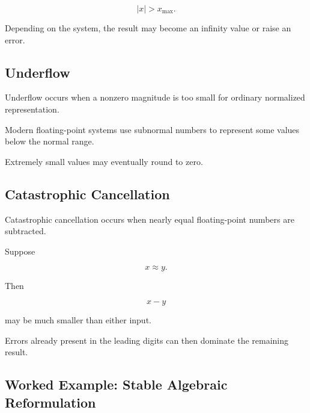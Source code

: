 \[
\boxed{
|x|
>
x_{\max}.
}
\]

Depending on the system, the result may become an infinity value or raise
an error.

\subsection{Underflow}
\label{subsec:numerical-underflow}

Underflow occurs when a nonzero magnitude is too small for ordinary
normalized representation.

Modern floating-point systems use subnormal numbers to represent some
values below the normal range.

Extremely small values may eventually round to zero.

\subsection{Catastrophic Cancellation}
\label{subsec:catastrophic-cancellation}

Catastrophic cancellation occurs when nearly equal floating-point numbers
are subtracted.

Suppose

\[
x
\approx
y.
\]

Then

\[
x-y
\]

may be much smaller than either input.

Errors already present in the leading digits can then dominate the
remaining result.

\subsection{Worked Example: Stable Algebraic Reformulation}
\label{subsec:worked-stable-reformulation}

